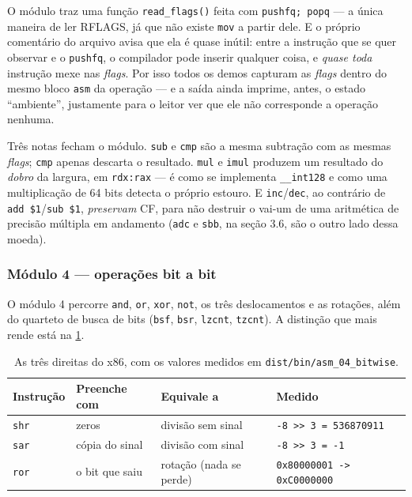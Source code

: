 \begin{armadilha}
O módulo traz uma função \texttt{read\_flags()} feita com
\texttt{pushfq; popq} --- a única maneira de ler RFLAGS, já que não existe
\texttt{mov} a partir dele. E o próprio comentário do arquivo avisa que ela é
quase inútil: entre a instrução que se quer observar e o \texttt{pushfq}, o
compilador pode inserir qualquer coisa, e \emph{quase toda} instrução mexe nas
\emph{flags}. Por isso todos os demos capturam as \emph{flags} dentro do mesmo
bloco \texttt{asm} da operação --- e a saída ainda imprime, antes, o estado
``ambiente'', justamente para o leitor ver que ele não corresponde a operação
nenhuma.
\end{armadilha}

Três notas fecham o módulo. \texttt{sub} e \texttt{cmp} são a mesma subtração
com as mesmas \emph{flags}; \texttt{cmp} apenas descarta o resultado.
\texttt{mul} e \texttt{imul} produzem um resultado do \emph{dobro} da largura,
em \texttt{rdx:rax} --- é como se implementa \texttt{\_\_int128} e como uma
multiplicação de 64 bits detecta o próprio estouro. E \texttt{inc}/\texttt{dec},
ao contrário de \texttt{add \$1}/\texttt{sub \$1}, \emph{preservam} CF, para não
destruir o vai-um de uma aritmética de precisão múltipla em andamento
(\texttt{adc} e \texttt{sbb}, na seção 3.6, são o outro lado dessa moeda).

\subsubsection{Módulo 4 --- operações bit a bit}

O módulo 4 percorre \texttt{and}, \texttt{or}, \texttt{xor}, \texttt{not}, os
três deslocamentos e as rotações, além do quarteto de busca de bits
(\texttt{bsf}, \texttt{bsr}, \texttt{lzcnt}, \texttt{tzcnt}). A distinção que
mais rende está na \cref{tab:shifts}.

\begin{table}[htbp]
\centering
\caption{As três direitas do x86, com os valores medidos em
         \texttt{dist/bin/asm\_04\_bitwise}.}
\label{tab:shifts}
\footnotesize
\begin{tabular}{@{}llll@{}}
\toprule
\textbf{Instrução} & \textbf{Preenche com} & \textbf{Equivale a} & \textbf{Medido} \\
\midrule
\texttt{shr} & zeros          & divisão sem sinal       & \texttt{-8 >> 3 = 536870911} \\
\texttt{sar} & cópia do sinal & divisão com sinal       & \texttt{-8 >> 3 = -1} \\
\texttt{ror} & o bit que saiu & rotação (nada se perde) & \texttt{0x80000001 -> 0xC0000000} \\
\bottomrule
\end{tabular}
\end{table}

